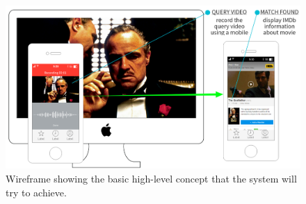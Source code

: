 \begin{figure}[h]
\centerline{\includegraphics[width=1.15\textwidth]{figures/system_wireframe.png}}
\caption{\label{fig:wireframe}Wireframe showing the basic high-level concept that the system will try to achieve.}
\end{figure}
